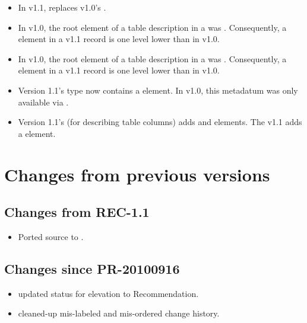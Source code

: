 \documentclass[11pt,a4paper]{ivoa}
\begin{document}
\begin{itemize}
\item In v1.1,  replaces v1.0's
       . 

\item In v1.0, the root element of a table description in a
        was
       .  Consequently, a
        element in a v1.1 record is one
       level lower than in v1.0.  

\item In v1.0, the root element of a table description in a
        was
       .  Consequently, a
        element in a v1.1 record is one
       level lower than in v1.0.  

\item Version 1.1's  type now
       contains a  element.  In
       v1.0, this metadatum was only available via
       .
       

\item Version 1.1's  (for describing table
       columns) adds  and
        elements.  The v1.1
        adds a 
       element. 
       
\end{itemize}


\section{Changes from previous versions}

\subsection{Changes from REC-1.1}

\begin{itemize}
\item Ported source to \ivoatex.
\end{itemize}

\subsection{Changes since PR-20100916}

\begin{itemize}
  \item updated status for elevation to Recommendation.
  \item cleaned-up mis-labeled and mis-ordered change history.
\end{itemize}
\end{document}
